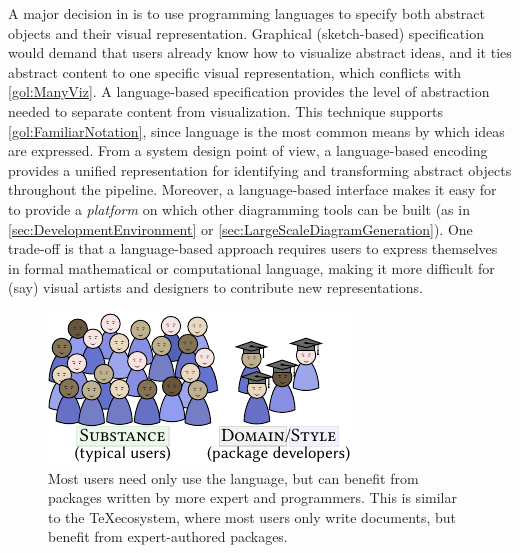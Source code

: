 A major decision in \Penrose{} is to use programming languages to specify both abstract objects and their visual representation.  Graphical (\eg sketch-based) specification would demand that users already know how to visualize abstract ideas, and it ties abstract content to one specific visual representation, which conflicts with \ref{gol:ManyViz}.  A language-based specification provides the level of abstraction needed to separate content from visualization. This technique supports \ref{gol:FamiliarNotation}, since language is the most common means by which ideas are expressed.  From a system design point of view, a language-based encoding provides a unified representation for identifying and transforming abstract objects throughout the pipeline.  Moreover, a language-based interface makes it easy for \Penrose{} to provide a \emph{platform} on which other diagramming tools can be built (as in \cref{sec:DevelopmentEnvironment} or \cref{sec:LargeScaleDiagramGeneration}).  One trade-off is that a language-based approach requires users to express themselves in formal mathematical or computational language, making it more difficult for (say) visual artists and designers to contribute new representations.

\begin{figure}[b]
  \begin{minipage}[c]{.35\linewidth}
    \caption{Most \Penrose{} users need only use the \Substance{} language, but can benefit from packages written by more expert \Domain{} and \Style{} programmers. This is similar to the \TeX ecosystem, where most users only write documents, but benefit from expert-authored packages.\label{fig:NoviceExpertUsers}}
  \end{minipage}\hfill
  \begin{minipage}[c]{.55\linewidth}
     \includegraphics[scale=1.5]{assets/penrose/NoviceExpertUsers.pdf}
  \end{minipage}\hfill
\end{figure}

